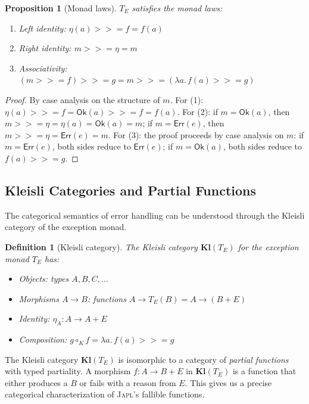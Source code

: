 \documentclass[11pt,twocolumn]{article}
\newtheorem{proposition}[theorem]{Proposition}
\newtheorem{definition}[theorem]{Definition}
\newcommand{\japl}{\textsc{Japl}}
\newcommand{\OK}{\ensuremath{\mathsf{Ok}}}
\newcommand{\Err}{\ensuremath{\mathsf{Err}}}
\newcommand{\Kleisli}{\mathbf{Kl}}
\begin{document}
\begin{proposition}[Monad laws]
$T_E$ satisfies the monad laws:
\begin{enumerate}
  \item Left identity: $\eta(a) \mathbin{>\!\!>\!\!=} f = f(a)$
  \item Right identity: $m \mathbin{>\!\!>\!\!=} \eta = m$
  \item Associativity: $(m \mathbin{>\!\!>\!\!=} f) \mathbin{>\!\!>\!\!=} g = m \mathbin{>\!\!>\!\!=} (\lambda a.\, f(a) \mathbin{>\!\!>\!\!=} g)$
\end{enumerate}
\end{proposition}

\begin{proof}
By case analysis on the structure of $m$. For (1): $\eta(a) \mathbin{>\!\!>\!\!=} f = \OK(a) \mathbin{>\!\!>\!\!=} f = f(a)$. For (2): if $m = \OK(a)$, then $m \mathbin{>\!\!>\!\!=} \eta = \eta(a) = \OK(a) = m$; if $m = \Err(e)$, then $m \mathbin{>\!\!>\!\!=} \eta = \Err(e) = m$. For (3): the proof proceeds by case analysis on $m$: if $m = \Err(e)$, both sides reduce to $\Err(e)$; if $m = \OK(a)$, both sides reduce to $f(a) \mathbin{>\!\!>\!\!=} g$.
\end{proof}

\subsection{Kleisli Categories and Partial Functions}

The categorical semantics of error handling can be understood through the Kleisli category of the exception monad.

\begin{definition}[Kleisli category]
The Kleisli category $\Kleisli(T_E)$ for the exception monad $T_E$ has:
\begin{itemize}
  \item Objects: types $A, B, C, \ldots$
  \item Morphisms $A \to B$: functions $A \to T_E(B) = A \to (B + E)$
  \item Identity: $\eta_A : A \to A + E$
  \item Composition: $g \circ_K f = \lambda a.\, f(a) \mathbin{>\!\!>\!\!=} g$
\end{itemize}
\end{definition}

The Kleisli category $\Kleisli(T_E)$ is isomorphic to a category of \emph{partial functions} with typed partiality. A morphism $f : A \to B + E$ in $\Kleisli(T_E)$ is a function that either produces a $B$ or fails with a reason from $E$. This gives us a precise categorical characterization of \japl{}'s fallible functions.
\end{document}
